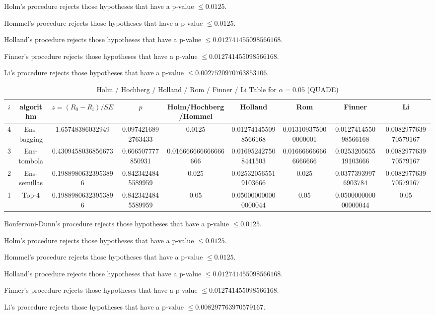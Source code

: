 \documentclass[a4paper,10pt]{article}
\begin{document}
\begin{landscape}
Holm's procedure rejects those hypotheses that have a p-value $\le0.0125$.


Hommel's procedure rejects those hypotheses that have a p-value $\le0.0125$.


Holland's procedure rejects those hypotheses that have a p-value $\le0.012741455098566168$.


Finner's procedure rejects those hypotheses that have a p-value $\le0.012741455098566168$.


Li's procedure rejects those hypotheses that have a p-value $\le0.0027520970763853106$.



\newpage

\begin{table}[!htp]
\centering\scriptsize
\caption{Holm / Hochberg / Holland / Rom / Finner / Li Table for $\alpha=0.05$ (QUADE)}
\begin{tabular}{ccccccccc}
$i$&algorithm&$z=(R_0 - R_i)/SE$&$p$&Holm/Hochberg/Hommel&Holland&Rom&Finner&Li\\
\hline
4&Ens-bagging&1.65748386032949&0.0974216892763433&0.0125&0.012741455098566168&0.013109375000000001&0.012741455098566168&0.008297763970579167\\
3&Ens-tombola&0.4309458036856673&0.666507777850931&0.016666666666666666&0.016952427508441503&0.016666666666666666&0.025320565519103666&0.008297763970579167\\
2&Ens-semillas&0.19889806323953896&0.8423424845589959&0.025&0.025320565519103666&0.025&0.03773939976903784&0.008297763970579167\\
1&Top-4&0.19889806323953896&0.8423424845589959&0.05&0.050000000000000044&0.05&0.050000000000000044&0.05\\
\hline
\end{tabular}
\end{table}
Bonferroni-Dunn's procedure rejects those hypotheses that have a p-value $\le0.0125$.


Holm's procedure rejects those hypotheses that have a p-value $\le0.0125$.


Hommel's procedure rejects those hypotheses that have a p-value $\le0.0125$.


Holland's procedure rejects those hypotheses that have a p-value $\le0.012741455098566168$.


Finner's procedure rejects those hypotheses that have a p-value $\le0.012741455098566168$.


Li's procedure rejects those hypotheses that have a p-value $\le0.008297763970579167$.




\end{landscape}
\end{document}
